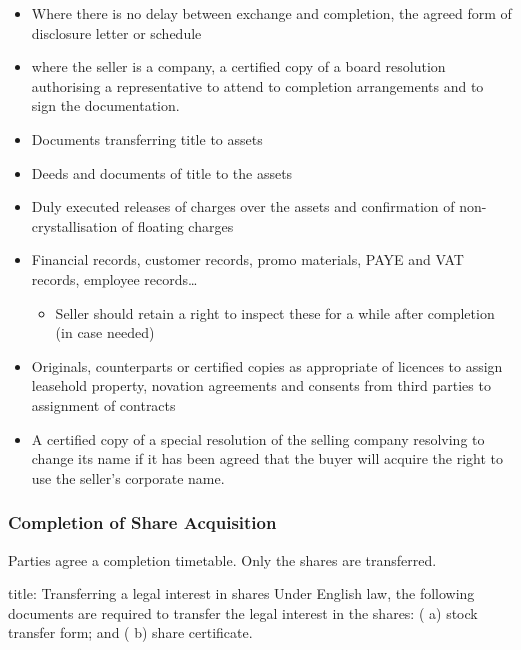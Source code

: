 \documentclass[
]{article}
\newenvironment{Shaded}{}{}
\newcommand{\NormalTok}[1]{#1}
\providecommand{\tightlist}{%
  \setlength{\itemsep}{0pt}\setlength{\parskip}{0pt}}
\begin{document}
\begin{itemize}
\tightlist
\item
  Where there is no delay between exchange and completion, the agreed
  form of disclosure letter or schedule
\item
  where the seller is a company, a certified copy of a board resolution
  authorising a representative to attend to completion arrangements and
  to sign the documentation.
\item
  Documents transferring title to assets
\item
  Deeds and documents of title to the assets
\item
  Duly executed releases of charges over the assets and confirmation of
  non-crystallisation of floating charges
\item
  Financial records, customer records, promo materials, PAYE and VAT
  records, employee records\ldots{}

  \begin{itemize}
  \tightlist
  \item
    Seller should retain a right to inspect these for a while after
    completion (in case needed)
  \end{itemize}
\item
  Originals, counterparts or certified copies as appropriate of licences
  to assign leasehold property, novation agreements and consents from
  third parties to assignment of contracts
\item
  A certified copy of a special resolution of the selling company
  resolving to change its name if it has been agreed that the buyer will
  acquire the right to use the seller's corporate name.
\end{itemize}

\hypertarget{completion-of-share-acquisition}{%
\subsubsection{Completion of Share
Acquisition}\label{completion-of-share-acquisition}}

Parties agree a completion timetable. Only the shares are transferred.

\begin{Shaded}
\begin{Highlighting}[]
\NormalTok{title: Transferring a legal interest in shares}
\NormalTok{Under English law, the following documents are required to transfer the legal interest in the shares:}
\NormalTok{ ( a) stock transfer form; and}
\NormalTok{ ( b) share certificate.}
\end{Highlighting}
\end{Shaded}
\end{document}
